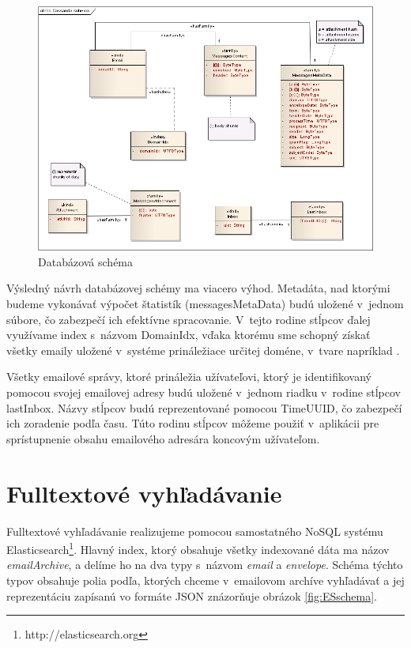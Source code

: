 \documentclass[11pt,twoside,a4paper]{book}
\begin{document}
\begin{figure}[h]
 \centering
 \includegraphics[width=17cm]{./figures/cassandra.png}
 \caption{Databázová schéma}
 \label{fig:Cschema}
\end{figure}

Výsledný návrh databázovej schémy ma viacero výhod. Metadáta, nad ktorými budeme vykonávať výpočet štatistík (messagesMetaData) budú uložené v~jednom súbore, čo zabezpečí ich efektívne spracovanie. V~tejto rodine stĺpcov ďalej využívame index s~názvom DomainIdx, vďaka ktorému sme schopný získať všetky emaily uložené v~systéme prináležiace určitej doméne, v~tvare napríklad . 

Všetky emailové správy, ktoré prináležia užívateľovi, ktorý je identifikovaný pomocou svojej emailovej adresy budú uložené v~jednom riadku v~rodine stĺpcov lastInbox. Názvy stĺpcov budú reprezentované pomocou TimeUUID, čo zabezpečí ich zoradenie podľa času. Túto rodinu stĺpcov môžeme použiť v~aplikácii pre sprístupnenie obsahu emailového adresára koncovým užívateľom.





\section{Fulltextové vyhľadávanie}

Fulltextové vyhľadávanie realizujeme pomocou samostatného NoSQL systému Elasticsearch\footnote{http://elasticsearch.org}. Hlavný index, ktorý obsahuje všetky indexované dáta ma názov \emph{emailArchive}, a delíme ho na dva typy s~názvom \emph{email} a \emph{envelope}. Schéma týchto typov obsahuje polia podľa, ktorých chceme v~emailovom archíve vyhľadávať a jej reprezentáciu zapísanú vo formáte JSON znázorňuje obrázok \ref{fig:ESschema}.
\end{document}

